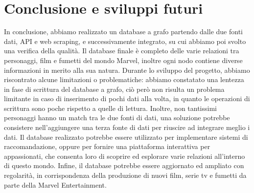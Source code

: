 \documentclass[
12pt, %
a4paper, %
oneside, %
headinclude,footinclude, %
BCOR5mm, %
]{scrartcl}
\begin{document}
\section{Conclusione e sviluppi futuri}
In conclusione, abbiamo realizzato un database a grafo partendo dalle due fonti dati, API e web scraping, e successivamente integrato, su cui abbiamo poi svolto una verifica della qualità. Il database finale è completo delle varie relazioni tra personaggi, film e fumetti del mondo Marvel, inoltre ogni nodo contiene diverse informazioni in merito alla sua natura.
Durante lo sviluppo del progetto, abbiamo riscontrato alcune limitazioni o problematiche: abbiamo constatato una lentezza in fase di scrittura del database a grafo, ciò però non risulta un problema limitante in caso di inserimento di pochi dati alla volta, in quanto le operazioni di scrittura sono poche rispetto a quelle di lettura. Inoltre, non tantissimi personaggi hanno un match tra le due fonti di dati, una soluzione potrebbe consistere nell'aggiungere una terza fonte di dati per riuscire ad integrare meglio i dati.
Il database realizzato potrebbe essere utilizzato per implementare sistemi di raccomandazione, oppure per fornire una piattaforma interattiva per appassionati, che consenta loro di scoprire ed esplorare varie relazioni all'interno di questo mondo.
Infine, il database potrebbe essere aggiornato ed ampliato con regolarità, in corrispondenza della produzione di nuovi film, serie tv e fumetti da parte della Marvel Entertainment.


\printbibliography %

\end{document}
